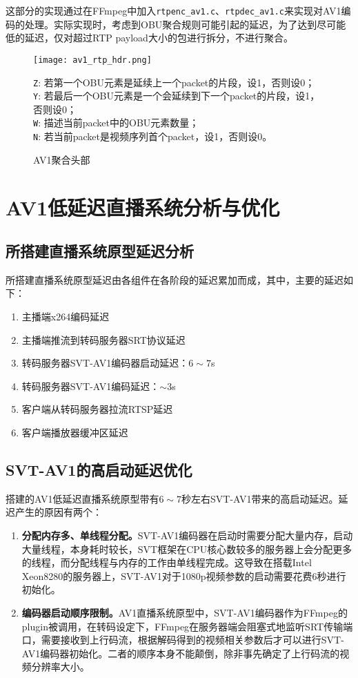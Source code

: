 	这部分的实现通过在FFmpeg中加入\texttt{rtpenc\_av1.c}、\texttt{rtpdec\_av1.c}来实现对AV1编码的处理。实际实现时，考虑到OBU聚合规则可能引起的延迟，为了达到尽可能低的延迟，仅对超过RTP payload大小的包进行拆分，不进行聚合。

	\begin{figure}[!htp]
		\centering
		\texttt{[image: av1\_rtp\_hdr.png]} \\
		\raggedright
		\texttt{Z}: 若第一个OBU元素是延续上一个packet的片段，设1，否则设0；\\
		\texttt{Y}: 若最后一个OBU元素是一个会延续到下一个packet的片段，设1，否则设0；\\
		\texttt{W}: 描述当前packet中的OBU元素数量；\\
		\texttt{N}: 若当前packet是视频序列首个packet，设1，否则设0。\\
		\caption{AV1聚合头部}
		\label{fig:av1rtp-aggr}
	\end{figure}
\section{AV1低延迟直播系统分析与优化}

\subsection{所搭建直播系统原型延迟分析}
	所搭建直播系统原型延迟由各组件在各阶段的延迟累加而成，其中，主要的延迟如下：
	\begin{enumerate} [label=\arabic*)]
		\item 主播端x264编码延迟
		\item 主播端推流到转码服务器SRT协议延迟
		\item 转码服务器SVT-AV1编码器启动延迟：$6\sim 7$s
		\item 转码服务器SVT-AV1编码延迟：$\sim 3$s
		\item 客户端从转码服务器拉流RTSP延迟
		\item 客户端播放器缓冲区延迟
	\end{enumerate}
\subsection{SVT-AV1的高启动延迟优化}
  搭建的AV1低延迟直播系统原型带有$6\sim 7$秒左右SVT-AV1带来的高启动延迟。延迟产生的原因有两个：

  \begin{enumerate} [label=\arabic*)]
    \item \textbf{分配内存多、单线程分配。}SVT-AV1编码器在启动时需要分配大量内存，启动大量线程，本身耗时较长，SVT框架在CPU核心数较多的服务器上会分配更多的线程，而分配线程与内存的工作由单线程完成。这导致在搭载Intel Xeon8280的服务器上，SVT-AV1对于1080p视频参数的启动需要花费6秒进行初始化。
    \item \textbf{编码器启动顺序限制。}AV1直播系统原型中，SVT-AV1编码器作为FFmpeg的plugin被调用，在转码设定下，FFmpeg在服务器端会阻塞式地监听SRT传输端口，需要接收到上行码流，根据解码得到的视频相关参数后才可以进行SVT-AV1编码器初始化。二者的顺序本身不能颠倒，除非事先确定了上行码流的视频分辨率大小。
  \end{enumerate}

